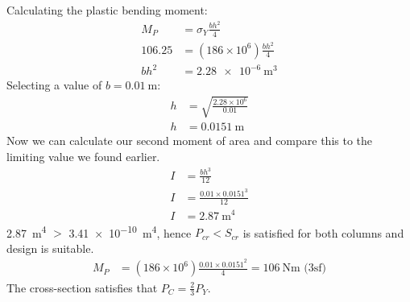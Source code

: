 \documentclass[11pt]{article}
\numberwithin{equation}{section}
\begin{document}
Calculating the plastic bending moment:
\begin{align}
    M_P &= \sigma_Y \frac{bh^2}{4}\\
    106.25 &= (186\times 10^6)\frac{bh^2}{4}\\
    bh^2 &= \SI{2.28e-6}{\meter^3}
\end{align}
Selecting a value of $b = \SI{0.01}{\meter}$:
\begin{align}
    h &= \sqrt{\frac{2.28\times 10^6}{0.01}}\\
    h &= \SI{0.0151}{\meter}
\end{align}
Now we can calculate our second moment of area and compare this to the limiting value we found earlier. 
\begin{align}
    I &= \frac{bh^3}{12}\\
    I &= \frac{0.01 \times 0.0151^3}{12}\\
    I &= \SI{2.87}{\meter\tothe{4}}
\end{align}
\SI{2.87}{\meter\tothe{4}} $>$ \SI{3.41e-10}{\meter\tothe{4}}, hence $P_{cr} < S_{cr}$ is satisfied for both columns and design is suitable. 
\begin{align}
    M_P &= (186\times 10^6)\frac{0.01 \times 0.0151^2}{4} = \SI{106}{\newton \meter} \textrm{ (3sf)}
\end{align}
The cross-section satisfies that $P_C = \frac{2}{3} P_Y$. 
\end{document}
